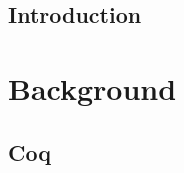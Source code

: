 \documentclass[12pt]{UOthesis}
\theoremstyle{remarkstyle}
\begin{document}



%

%

%

%


\chapter{Introduction}



\cleardoublepage


\part{Background}
\label{pt:background}


%


\chapter{Coq}
\label{ch:coq}
\end{document}
